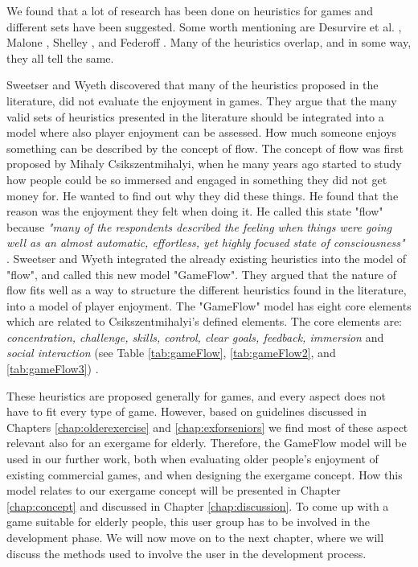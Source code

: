 We found that a lot of research has been done on heuristics for games and different sets have been suggested. Some worth mentioning are Desurvire et al. \cite{desurvire}, Malone \cite{malone}, Shelley \cite{shelley}, and Federoff \cite{federoff}. Many of the heuristics overlap, and in some way, they all tell the same. 

Sweetser and Wyeth \cite{sweetser} discovered that many of the heuristics proposed in the literature, did not evaluate the enjoyment in games. They argue that the many valid sets of heuristics presented in the literature should be integrated into a model where also player enjoyment can be assessed. How much someone enjoys something can be described by the concept of flow. The concept of flow was first proposed by  Mihaly Csikszentmihalyi, when he many years ago started to study how people could be so immersed and engaged in something they did not get money for. He wanted to find out why they did these things. He found that the reason was the enjoyment they felt when doing it. He called this state "flow" because \emph{"many of the respondents described the feeling when things were going well as an almost automatic, effortless, yet highly focused state of consciousness"} \cite{flow}.  Sweetser and Wyeth integrated the already existing heuristics into the model of "flow", and called this new model "GameFlow". They argued that the nature of flow fits well as a way to structure the different heuristics found in the literature, into a model of player enjoyment. The "GameFlow" model has eight core elements which are related to Csikszentmihalyi's defined elements. The core elements are: \emph{concentration, challenge, skills, control, clear goals, feedback, immersion} and \emph{social interaction} (see Table \ref{tab:gameFlow}, \ref{tab:gameFlow2}, and \ref{tab:gameFlow3}) \cite{sweetser}. 

These heuristics are proposed generally for games, and every aspect does not have to fit every type of game. However, based on guidelines discussed in Chapters \ref{chap:olderexercise} and \ref{chap:exforseniors} we find most of these aspect relevant also for an exergame for elderly. Therefore, the GameFlow model will be used in our further work, both when evaluating older people's enjoyment of existing commercial games, and when designing the exergame concept. How this model relates to our exergame concept will be presented in Chapter \ref{chap:concept} and discussed in Chapter \ref{chap:discussion}. To come up with a game suitable for elderly people, this user group has to be involved in the development phase. We will now move on to the next chapter, where we will discuss the methods used to involve the user in the development process.

